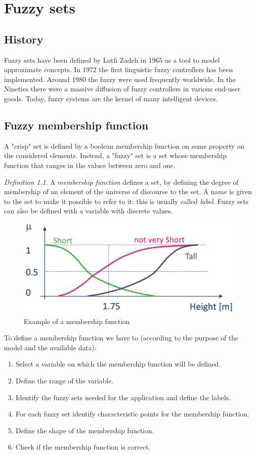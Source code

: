 \documentclass[12pt, a4paper]{report}
\theoremstyle{remark}
\newtheorem*{remark}{Definition}
\begin{document}
    \newpage

    \chapter{Fuzzy sets}
    \section{History}
    Fuzzy sets have been defined by Lotfi Zadeh in 1965 as a tool to model approximate concepts. In 1972 the first linguistic fuzzy
    controllers has been implemented. Around 1980 the fuzzy were used frequently worldwide. In the Nineties there were a massive 
    diffusion of fuzzy controllers in various end-user goods. Today, fuzzy systems are the kernel of many intelligent devices. 

    \section{Fuzzy membership function}
    A "crisp" set is defined by a boolean membership function on some property on the considered elements. Instead, a "fuzzy" set is
    a set whose membership function that ranges in the values between zero and one.
    \begin{remark}
        A \emph{membership function} defines a set, by defining the degree of membership of an element of the universe of discourse 
        to the set. A name is given to the set to make it possible to refer to it: this is usually called \emph{label}. Fuzzy sets can 
        also be defined with a variable with discrete values. 
    \end{remark}
    \begin{figure}[H]
        \centering
        \includegraphics[width=0.50\linewidth]{images/function.png}
        \caption{Example of a membership function}
    \end{figure}
    To define a membership function we have to (according to the purpose of the model and the available data):
    \begin{enumerate}
        \item Select a variable on which the membership function will be defined. 
        \item Define the range of the variable.
        \item Identify the fuzzy sets needed for the application and define the labels. 
        \item For each fuzzy set identify characteristic points for the membership function.
        \item Define the shape of the membership function.
        \item Check if the membership function is correct.
    \end{enumerate}
\end{document}
